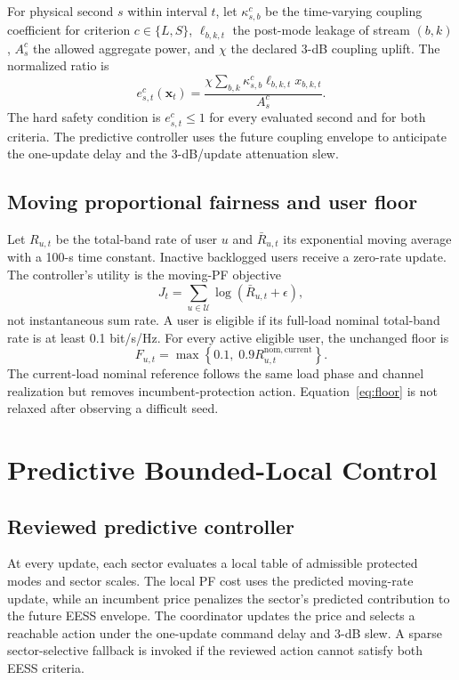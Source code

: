 \documentclass[journal]{IEEEtran}
\newcommand{\U}{\mathcal{U}}
\begin{document}
For physical second $s$ within interval $t$, let $\kappa^{c}_{s,b}$ be the time-varying coupling coefficient for criterion $c\in\{L,S\}$, $\ell_{b,k,t}$ the post-mode leakage of stream $(b,k)$, $A^{c}_{s}$ the allowed aggregate power, and $\chi$ the declared 3-dB coupling uplift. The normalized ratio is
\begin{equation}
 e^{c}_{s,t}(\bm x_t)=
 \frac{\chi\sum_{b,k}\kappa^{c}_{s,b}\ell_{b,k,t}x_{b,k,t}}
 {A^{c}_{s}}.
 \label{eq:eess}
\end{equation}
The hard safety condition is $e^{c}_{s,t}\le 1$ for every evaluated second and for both criteria. The predictive controller uses the future coupling envelope to anticipate the one-update delay and the 3-dB/update attenuation slew.

\subsection{Moving proportional fairness and user floor}
Let $R_{u,t}$ be the total-band rate of user $u$ and $\bar R_{u,t}$ its exponential moving average with a 100-s time constant. Inactive backlogged users receive a zero-rate update. The controller's utility is the moving-PF objective
\begin{equation}
 J_t=\sum_{u\in\U}\log\!\left(\bar R_{u,t}+\epsilon\right),
 \label{eq:pf}
\end{equation}
not instantaneous sum rate. A user is eligible if its full-load nominal total-band rate is at least 0.1 bit/s/Hz. For every active eligible user, the unchanged floor is
\begin{equation}
 F_{u,t}=\max\!\left\{0.1,\;0.9R^{\mathrm{nom,current}}_{u,t}\right\}.
 \label{eq:floor}
\end{equation}
The current-load nominal reference follows the same load phase and channel realization but removes incumbent-protection action. Equation~\eqref{eq:floor} is not relaxed after observing a difficult seed.

\section{Predictive Bounded-Local Control}
\subsection{Reviewed predictive controller}
At every update, each sector evaluates a local table of admissible protected modes and sector scales. The local PF cost uses the predicted moving-rate update, while an incumbent price penalizes the sector's predicted contribution to the future EESS envelope. The coordinator updates the price and selects a reachable action under the one-update command delay and 3-dB slew. A sparse sector-selective fallback is invoked if the reviewed action cannot satisfy both EESS criteria.
\end{document}
